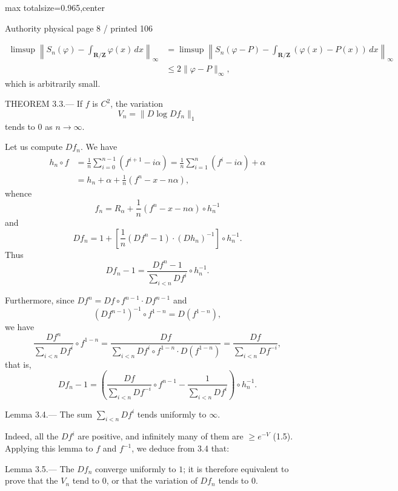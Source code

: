 \documentclass{article}
\begin{document}
\newpage
\noindent\begin{adjustbox}{max totalsize={\textwidth}{0.965\textheight},center}\begin{minipage}{\textwidth}
\noindent\hfill\scriptsize Authority physical page 8 / printed 106\par\normalsize
\[
\begin{aligned}
\limsup\left\|S_n(\varphi)-\int_{\mathbf R/\mathbf Z}\varphi(x)\,dx\right\|_\infty
&=\limsup\left\|S_n(\varphi-P)-\int_{\mathbf R/\mathbf Z}(\varphi(x)-P(x))\,dx\right\|_\infty\\
&\leq2\|\varphi-P\|_\infty,
\end{aligned}
\]
which is arbitrarily small.

THEOREM 3.3.— If \(f\) is \(C^2\), the variation
\[
V_n=\|D\log Df_n\|_1
\]
tends to \(0\) as \(n\to\infty\).

Let us compute \(Df_n\). We have
\[
\begin{aligned}
h_n\circ f
&=\frac1n\sum_{i=0}^{n-1}(f^{i+1}-i\alpha)
=\frac1n\sum_{i=1}^{n}(f^i-i\alpha)+\alpha\\
&=h_n+\alpha+\frac1n(f^n-x-n\alpha),
\end{aligned}
\]
whence
\[
f_n=R_\alpha+\frac1n(f^n-x-n\alpha)\circ h_n^{-1}
\]
and
\[
Df_n=1+\left[\frac1n(Df^n-1)\cdot(Dh_n)^{-1}\right]\circ h_n^{-1}.
\]
Thus
\[
Df_n-1=\frac{Df^n-1}{\sum_{i<n}Df^i}\circ h_n^{-1}.
\]

Furthermore, since \(Df^n=Df\circ f^{n-1}\cdot Df^{n-1}\) and
\[
(Df^{n-1})^{-1}\circ f^{1-n}=D(f^{1-n}),
\]
we have
\[
\frac{Df^n}{\sum_{i<n}Df^i}\circ f^{1-n}
=\frac{Df}{\sum_{i<n}Df^i\circ f^{1-n}\cdot D(f^{1-n})}
=\frac{Df}{\sum_{i<n}Df^{-i}},
\]
that is,
\[
\tag{3.3.1}
Df_n-1=\left(\frac{Df}{\sum_{i<n}Df^{-i}}\circ f^{n-1}-\frac1{\sum_{i<n}Df^i}\right)\circ h_n^{-1}.
\]

Lemma 3.4.— The sum \(\sum_{i<n}Df^i\) tends uniformly to \(\infty\).

Indeed, all the \(Df^i\) are positive, and infinitely many of them are \(\geq e^{-V}\) (1.5). Applying this lemma to \(f\) and \(f^{-1}\), we deduce from 3.4 that:

Lemma 3.5.— The \(Df_n\) converge uniformly to \(1\); it is therefore equivalent to prove that the \(V_n\) tend to \(0\), or that the variation of \(Df_n\) tends to \(0\).
\end{minipage}\end{adjustbox}
\end{document}
